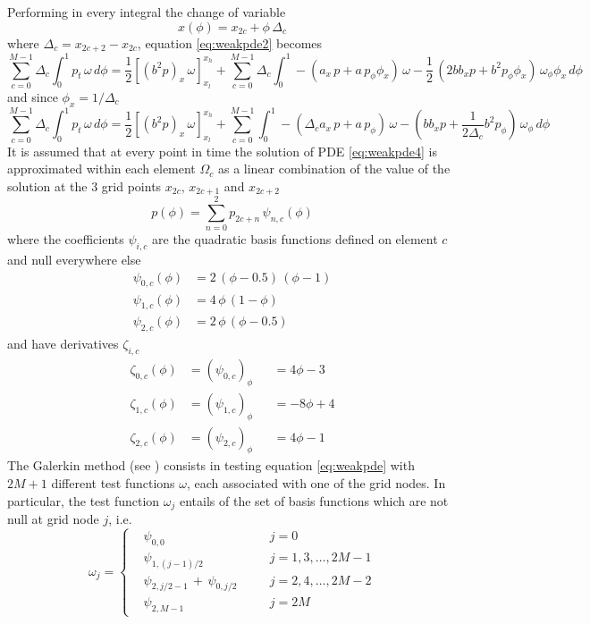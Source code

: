 \documentclass[10pt]{article}
\newcommand {\dv}[1]{\Delta_{#1}}
\newcommand {\dvc}[0]{\dv{c}}
\begin{document}
\noindent Performing in every integral the change of variable 
\begin{equation}
\label{eq:changeofvar}
	 x(\phi) = x_{2c} + \phi \, \dvc
\end{equation}
where $\dvc=x_{2c+2}-x_{2c}$, equation \eqref{eq:weakpde2} becomes
\begin{equation*}
\sum_{c=0}^{M-1}\dvc\int_0^1 p_t\, \omega\, d\phi =
\frac{1}{2} [ (b^2p)_x \, \omega ]_{x_l}^{x_h}
+\sum_{c=0}^{M-1}\dvc\int_0^1 -(a_x\, p+a\,p_\phi\phi_x)\,\omega -\frac{1 }{2} \, (2bb_xp+b^2p_\phi\phi_x) \,\omega_{\phi}\phi_x\,d\phi
\end{equation*}
and since $\phi_x=1/\dvc$
\begin{equation}
\label{eq:weakpde4}
\sum_{c=0}^{M-1}\dvc\int_0^1 p_t\, \omega\, d\phi =
\frac{1}{2} [ (b^2p)_x \, \omega ]_{x_l}^{x_h}
+\sum_{c=0}^{M-1}\int_0^1 -(\dvc a_x\, p+a\,p_\phi)\,\omega -\left(bb_xp+\frac{1}{2\dvc} b^2p_\phi\right) \,\omega_{\phi}\,d\phi
\end{equation}
It is assumed that at every point in time the solution of PDE \eqref{eq:weakpde4} is approximated within each element $\Omega_c$ as a linear combination of the value of the solution at the 3 grid points $x_{2c},\,x_{2c+1}$ and $x_{2c+2}$
\begin{equation}
\label{eq:papprox}
   p(\phi)=\sum_{n=0}^{2}p_{2c+n}\,\psi_{n,c}(\phi)
\end{equation}
where the coefficients $\psi_{i,c}$ are the quadratic basis functions defined on element $c$ and null everywhere else
\begin{equation}
\label{eq:basis}
\begin{split}
\psi_{0,c}(\phi) &= 2\,(\phi-0.5)\,(\phi-1) \\
\psi_{1,c}(\phi) &= 4\,\phi\,(1-\phi) \\
\psi_{2,c}(\phi) &= 2\,\phi\,(\phi-0.5)
\end{split}
\end{equation}
and have derivatives $\zeta_{i,c}$
\begin{equation}
\label{eq:basisderiv}
\begin{aligned}
\zeta_{0,c}(\phi) &= (\psi_{0,c})_\phi &&= 4\phi-3 \\
\zeta_{1,c}(\phi) &= (\psi_{1,c})_\phi &&= -8\phi+4 \\
\zeta_{2,c}(\phi) &= (\psi_{2,c})_\phi &&= 4\phi-1
\end{aligned}
\end{equation}
The Galerkin method (see \cite{hunter}) consists in testing equation \eqref{eq:weakpde} with $2M+1$ different test functions $\omega$, each associated with one of the grid nodes. In particular, the test function $\omega_{j}$ entails of the set of basis functions which are not null at grid node $j$, i.e.
$$
   \omega_j=\left\{\begin{aligned}
     &\psi_{0,0} &&\quad j=0 \\
     &\psi_{1,(j-1)/2} &&\quad j=1,3,\dots,2M-1 \\
     &\psi_{2,j/2-1}\,+\,\psi_{0,j/2} &&\quad j=2,4,\dots,2M-2 \\
     &\psi_{2,M-1} &&\quad j=2M
   \end{aligned}\right.
$$
\end{document}
